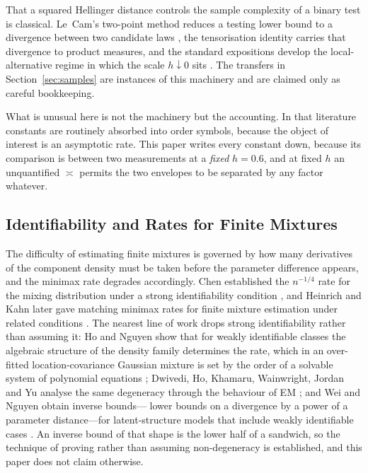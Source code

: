 \documentclass[conference]{IEEEtran}
\theoremstyle{definition}
\begin{document}
That a squared Hellinger distance controls the sample complexity of a binary test is
classical. Le~Cam's two-point method reduces a testing lower bound to a divergence between
two candidate laws \cite{lecam1973}, the tensorisation identity carries that divergence to
product measures, and the standard expositions develop the local-alternative regime in which
the scale $h\downarrow0$ sits \cite{tsybakov2009,ibragimov1981}. The transfers in
Section~\ref{sec:samples} are instances of this machinery and are claimed only as careful
bookkeeping.

What is unusual here is not the machinery but the accounting. In that literature constants
are routinely absorbed into order symbols, because the object of interest is an asymptotic
rate. This paper writes every constant down, because its comparison is between two
measurements at a \emph{fixed} $h=0.6$, and at fixed $h$ an unquantified $\asymp$ permits
the two envelopes to be separated by any factor whatever.

\subsection{Identifiability and Rates for Finite Mixtures}

The difficulty of estimating finite mixtures is governed by how many derivatives of the
component density must be taken before the parameter difference appears, and the minimax
rate degrades accordingly. Chen established the $n^{-1/4}$ rate for the mixing distribution
under a strong identifiability condition \cite{chen1995}, and Heinrich and Kahn later gave
matching minimax rates for finite mixture estimation under related conditions
\cite{heinrich2018}. The nearest line of work drops strong identifiability rather than
assuming it: Ho and Nguyen show that for weakly identifiable classes the algebraic structure
of the density family determines the rate, which in an over-fitted location-covariance
Gaussian mixture is set by the order of a solvable system of polynomial equations
\cite{ho2015}; Dwivedi, Ho, Khamaru, Wainwright, Jordan and Yu analyse the same degeneracy
through the behaviour of EM \cite{dwivedi2019}; and Wei and Nguyen obtain inverse bounds---%
lower bounds on a divergence by a power of a parameter distance---for latent-structure
models that include weakly identifiable cases \cite{wei2020}. An inverse bound of that shape
is the lower half of a sandwich, so the technique of proving rather than assuming
non-degeneracy is established, and this paper does not claim otherwise.
\end{document}
